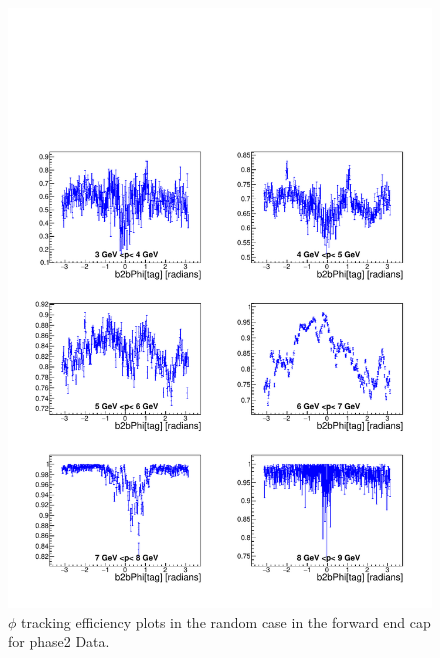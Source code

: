 \documentclass[a4paper,11pt,twosided,final,german,openbib,pdftex,listof=totoc,bibliography=totoc]{scrbook}
\begin{document}
\begin{appendix}
\begin{figure}[!htbp]
	\centering
	\includegraphics[width=\textwidth]{Plots/master/xPMPhiRandomFC_Data}
	\caption[Momentum $\phi$ Random Forward End Cap Efficiency Phase2 Data]{$\phi$ tracking efficiency plots in the random case in the forward end cap for phase2 Data.}
	\label{plt:PMPhiRandomFC_Data}
\end{figure}



\end{appendix}
\end{document}
